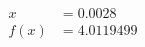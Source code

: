 \documentclass[preview]{standalone}
\begin{document}
\begin{align*}
x &= 0.0028\\f(x) &= 4.0119499
\end{align*}
\end{document}
